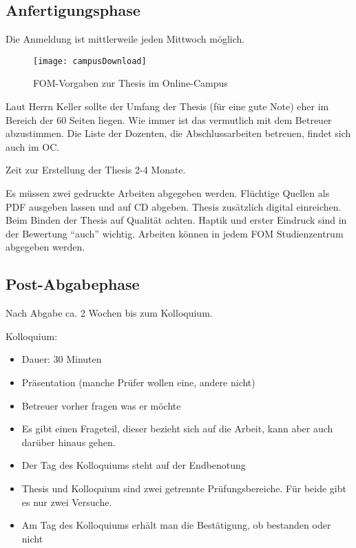 \newpage
\subsection{Anfertigungsphase}
Die Anmeldung ist mittlerweile jeden Mittwoch möglich.
\begin{figure}[H]
\caption{FOM-Vorgaben zur Thesis im Online-Campus}
\texttt{[image: campusDownload]}
\\
\cite[Quelle: Vgl.][]{FOM}
\end{figure}

Laut Herrn Keller sollte der Umfang der Thesis (für eine gute Note) eher im Bereich der 60 Seiten liegen. Wie immer ist das vermutlich mit dem Betreuer abzustimmen. Die Liste der Dozenten, die Abschlussarbeiten betreuen, findet sich auch im \ac{OC}.

Zeit zur Erstellung der Thesis 2-4 Monate.

Es müssen zwei gedruckte Arbeiten abgegeben werden. Flüchtige Quellen als PDF ausgeben lassen und auf CD abgeben. Thesis zusätzlich digital einreichen. Beim Binden der Thesis auf Qualität achten. Haptik und erster Eindruck sind in der Bewertung \enquote{auch} wichtig. Arbeiten können in jedem FOM Studienzentrum abgegeben werden.

\subsection{Post-Abgabephase}
Nach Abgabe ca. 2 Wochen bis zum Kolloquium.

Kolloquium:
\begin{itemize}
\item Dauer: 30 Minuten
\item Präsentation (manche Prüfer wollen eine, andere nicht)
\item Betreuer vorher fragen was er möchte
\item Es gibt einen Frageteil, dieser bezieht sich auf die Arbeit, kann aber auch darüber hinaus gehen.
\item Der Tag des Kolloquiums steht auf der Endbenotung
\item Thesis und Kolloquium sind zwei getrennte Prüfungsbereiche. Für beide gibt es nur zwei Versuche.
\item Am Tag des Kolloquiums erhält man die Bestätigung, ob bestanden oder nicht
\end{itemize}
